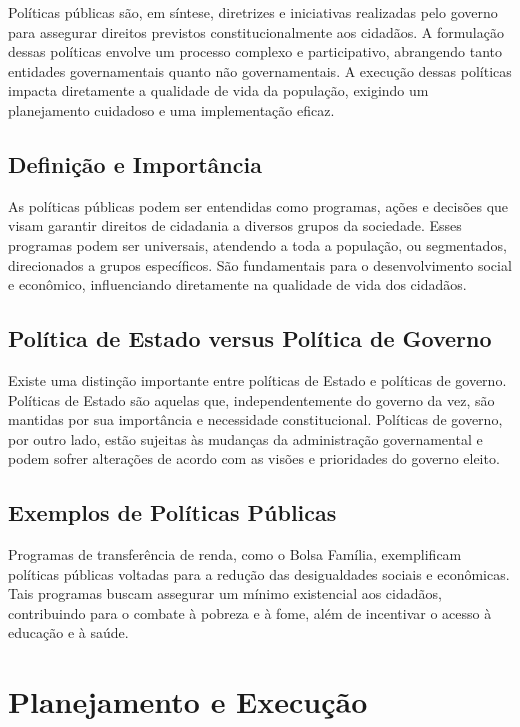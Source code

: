 \documentclass[
   article,       
   12pt,          
   oneside,       
   a4paper,       
   english,       
   brazil,        
   sumario=tradicional
   ]{abntex2}
\begin{document}
Políticas públicas são, em síntese, diretrizes e iniciativas realizadas pelo governo para assegurar direitos previstos constitucionalmente aos cidadãos. A formulação dessas políticas envolve um processo complexo e participativo, abrangendo tanto entidades governamentais quanto não governamentais. A execução dessas políticas impacta diretamente a qualidade de vida da população, exigindo um planejamento cuidadoso e uma implementação eficaz.

\subsection{Definição e Importância}

As políticas públicas podem ser entendidas como programas, ações e decisões que visam garantir direitos de cidadania a diversos grupos da sociedade. Esses programas podem ser universais, atendendo a toda a população, ou segmentados, direcionados a grupos específicos. São fundamentais para o desenvolvimento social e econômico, influenciando diretamente na qualidade de vida dos cidadãos.

\subsection{Política de Estado versus Política de Governo}

Existe uma distinção importante entre políticas de Estado e políticas de governo. Políticas de Estado são aquelas que, independentemente do governo da vez, são mantidas por sua importância e necessidade constitucional. Políticas de governo, por outro lado, estão sujeitas às mudanças da administração governamental e podem sofrer alterações de acordo com as visões e prioridades do governo eleito.

\subsection{Exemplos de Políticas Públicas}

Programas de transferência de renda, como o Bolsa Família, exemplificam políticas públicas voltadas para a redução das desigualdades sociais e econômicas. Tais programas buscam assegurar um mínimo existencial aos cidadãos, contribuindo para o combate à pobreza e à fome, além de incentivar o acesso à educação e à saúde.

\section{Planejamento e Execução}
\end{document}
